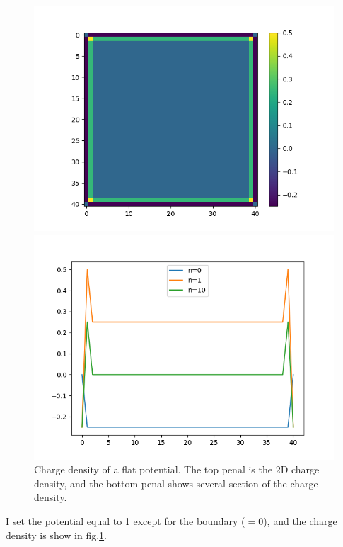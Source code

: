 \documentclass[showpacs, oneside, onecolumn, prl, amsmath, amssymb, nofootinbib, superscriptaddress, notitlepage]{revtex4-1}
\newcommand\bfig{\begin{figure}}
\newcommand\efig{\end{figure}}
\begin{document}
\bfig
	\centering
	\subfigure
	{\begin{minipage}[b]{1\textwidth}
	\includegraphics[scale=0.9]{7-2-2-1.png}
	\end{minipage}}
	\subfigure
	{\begin{minipage}[b]{1\textwidth}
	\includegraphics[scale=0.9]{7-2-2-2.png}
	\end{minipage}}
	\caption{Charge density of a flat potential. The top penal is the 2D charge density, and the bottom penal shows several section of the charge density.}
	\label{7-2-2}
\efig

I set the potential equal to 1 except for the boundary ($=0$), and the charge density is show in fig.\ref{7-2-2}.
\end{document}
